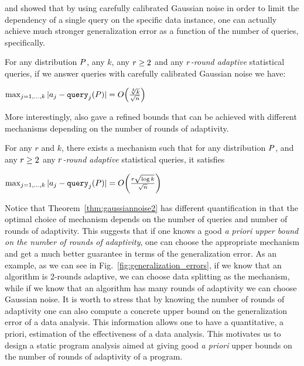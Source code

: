 \citet{DworkFHPRR15} and \citet{BassilyNSSSU16} showed that by using carefully calibrated Gaussian noise in order to limit the dependency of a single query on the specific data instance, one 
can actually achieve much stronger generalization error as a function of the number of queries, specifically.
\begin{thm} \label{thm:gaussiannoise} For any distribution $P$, any $k$, any $r \geq 2$ and any \emph{$r$-round adaptive} statistical queries, if we answer queries with carefully calibrated Gaussian noise we have:
\begin{center}
  $
\max_{j=1,\dots,k} | \answer_j - \query_j(\dist) | = O\left( \frac{\sqrt[4]{k}}{\sqrt{n}}  \right)
$  
\end{center}
\end{thm}
More interestingly, \citet{DworkFHPRR15}
also gave a refined bounds that can be achieved with different mechanisms depending on the number of rounds of adaptivity.   \begin{thm} \label{thm:gaussiannoise2} For any $r$ and $k$, there exists a mechanism such that for any distribution $P$, and any $r \geq 2$ any \emph{$r$-round adaptive} statistical queries, it satisfies
\begin{center}
  $
\max_{j=1,\dots,k} | \answer_j - \query_j(\dist) | = O\left( \frac{r \sqrt{\log k}}{\sqrt{n}}  \right)
$  
\end{center}
\end{thm}
Notice that Theorem~\ref{thm:gaussiannoise2} has different quantification in that the optimal choice of mechanism depends on the number of queries {and number of rounds of adaptivity}.  This suggests that if one knows a good \emph{a priori upper bound on the number of rounds of adaptivity}, one can choose the appropriate mechanism and get a much better guarantee in terms of the generalization error.
As an example, as we can see in Fig.~\ref{fig:generalization_errors}, if we know that an algorithm is 2-rounds adaptive, we can choose data splitting as {the} mechanism, while if we know that an algorithm has many rounds of adaptivity we can choose Gaussian noise. It is worth to stress that by knowing the number of rounds of adaptivity one can also compute a concrete upper bound on the generalization error of a data analysis. This information allows one to have a quantitative, a priori, estimation of the effectiveness of a data analysis. 
This motivates us to design a static program analysis aimed at giving good \emph{a priori} upper bounds on the number of rounds of adaptivity of a program. 

